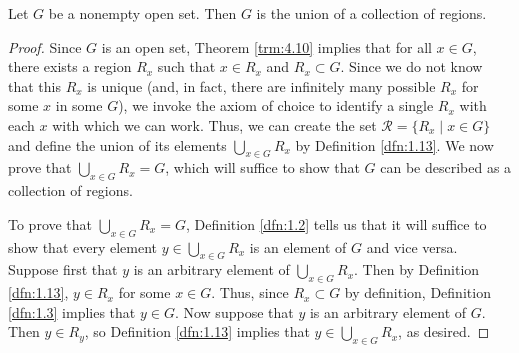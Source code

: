 \documentclass[../main.tex]{subfiles}
\begin{document}
\begin{theorem}\label{trm:4.14}
    Let $G$ be a nonempty open set. Then $G$ is the union of a collection of regions.
    \begin{proof}
        Since $G$ is an open set, Theorem \ref{trm:4.10} implies that for all $x\in G$, there exists a region $R_x$ such that $x\in R_x$ and $R_x\subset G$. Since we do not know that this $R_x$ is unique (and, in fact, there are infinitely many possible $R_x$ for some $x$ in some $G$), we invoke the axiom of choice to identify a single $R_x$ with each $x$ with which we can work. Thus, we can create the set $\mathcal{R}=\{R_x\mid x\in G\}$ and define the union of its elements $\bigcup_{x\in G}R_x$ by Definition \ref{dfn:1.13}. We now prove that $\bigcup_{x\in G}R_x=G$, which will suffice to show that $G$ can be described as a collection of regions.\par
        To prove that $\bigcup_{x\in G}R_x=G$, Definition \ref{dfn:1.2} tells us that it will suffice to show that every element $y\in\bigcup_{x\in G}R_x$ is an element of $G$ and vice versa. Suppose first that $y$ is an arbitrary element of $\bigcup_{x\in G}R_x$. Then by Definition \ref{dfn:1.13}, $y\in R_x$ for some $x\in G$. Thus, since $R_x\subset G$ by definition, Definition \ref{dfn:1.3} implies that $y\in G$. Now suppose that $y$ is an arbitrary element of $G$. Then $y\in R_y$, so Definition \ref{dfn:1.13} implies that $y\in\bigcup_{x\in G}R_x$, as desired.
    \end{proof}
\end{theorem}
\end{document}
